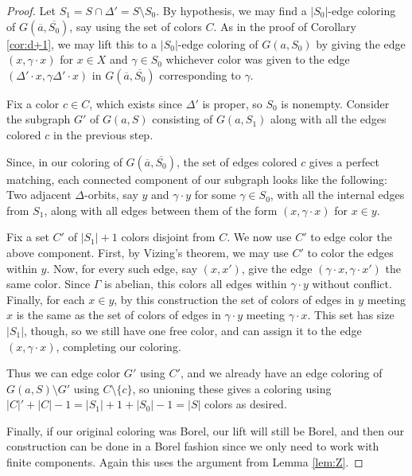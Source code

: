 \documentclass[12pt]{article}
\newcommand{\0}{\varnothing}
\begin{document}
\begin{proof}
Let $S_1 = S \cap \Delta' = S \setminus S_0$. By hypothesis, we may find a $|S_0|$-edge coloring of $G(\overline{a},\overline{S_0})$, say using the set of colors $C$. As in the proof of Corollary \ref{cor:d+1}, we may lift this to a $|S_0|$-edge coloring of $G(a,S_0)$ by giving the edge $(x,\gamma \cdot x)$ for $x \in X$ and $\gamma \in S_0$ whichever color was given to the edge $(\Delta' \cdot x, \gamma \Delta' \cdot x)$ in $G(\overline{a},\overline{S_0})$ corresponding to $\gamma$.


Fix a color $c \in C$, which exists since $\Delta'$ is proper, so $S_0$ is nonempty. Consider the subgraph $G'$ of $G(a,S)$ consisting of $G(a,S_1)$ along with all the edges colored $c$ in the previous step. 

Since, in our coloring of $G(\overline{a},\overline{S_0})$, the set of edges colored $c$ gives a perfect matching, each connected component of our subgraph looks like the following: Two adjacent $\Delta$-orbits, say $y$ and $\gamma \cdot y$ for some $\gamma \in S_0$, with all the internal edges from $S_1$, along with all edges between them of the form $(x,\gamma \cdot x)$ for $x \in y$.

Fix a set $C'$ of $|S_1|+1$ colors disjoint from $C$. We now use $C'$ to edge color the above component. First, by Vizing's theorem, we may use $C'$ to color the edges within $y$. Now, for every such edge, say $(x,x')$, give the edge $(\gamma \cdot x, \gamma \cdot x')$ the same color. Since $\Gamma$ is abelian, this colors all edges within $\gamma \cdot y$ without conflict. Finally, for each $x \in y$, by this construction the set of colors of edges in $y$ meeting $x$ is the same as the set of colors of edges in $\gamma \cdot y$ meeting $\gamma \cdot x$. This set has size $|S_1|$, though, so we still have one free color, and can assign it to the edge $(x,\gamma \cdot x)$, completing our coloring.

Thus we can edge color $G'$ using $C'$, and we already have an edge coloring of $G(a,S) \setminus G'$ using $C \setminus \{c\}$, so unioning these gives a coloring using $|C|'+|C|-1 = |S_1|+1 + |S_0| - 1 = |S|$ colors as desired.

Finally, if our original coloring was Borel, our lift will still be Borel, and then our construction can be done in a Borel fashion since we only need to work with finite components. Again this uses the argument from Lemma \ref{lem:Z}.
\end{proof}
\end{document}
